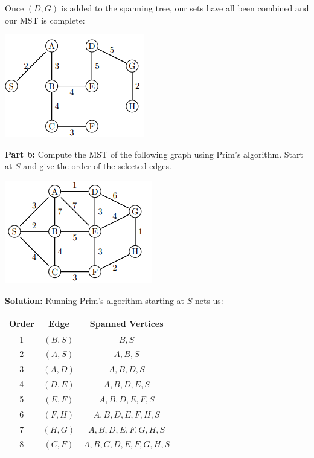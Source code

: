 \documentclass{article}
\begin{document}
Once $(D,G)$ is added to the spanning tree, our sets have all been combined and our MST is complete:
\begin{center}
  \includegraphics{graph4aMST.png}
\end{center}
\newpage

\noindent\textbf{Part b:} Compute the MST of the following graph using Prim's algorithm. Start at $S$ and give the order of the selected edges.
\begin{center}
  \includegraphics{graph4b.png}
\end{center}
\bigskip

\noindent\textbf{Solution:} Running Prim's algorithm starting at $S$ nets us:
\begin{center}
\begin{tabular}{c|c|c}
  \textbf{Order} & \textbf{Edge} & \textbf{Spanned Vertices}\\
  \hline
  1 & $(B,S)$ & $B,S$\\
  \hline
  2 & $(A,S)$ & $A,B,S$\\
  \hline
  3 & $(A,D)$ & $A,B,D,S$\\
  \hline
  4 & $(D,E)$ & $A,B,D,E,S$\\
  \hline
  5 & $(E,F)$ & $A,B,D,E,F,S$\\
  \hline
  6 & $(F,H)$ & $A,B,D,E,F,H,S$\\
  \hline
  7 & $(H,G)$ & $A,B,D,E,F,G,H,S$\\
  \hline
  8 & $(C,F)$ & $A,B,C,D,E,F,G,H,S$
\end{tabular}
\end{center}
\smallskip
\end{document}
